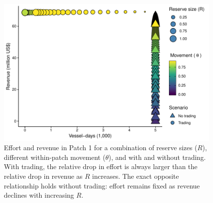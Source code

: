 \documentclass[12pt]{article}
\begin{document}
\begin{figure}
	\centering
	\includegraphics{img/effort_and_revenues.pdf}
	\caption{\label{fig:effort_and_revenues}Effort and revenue in Patch 1 for a combination of reserve sizes ($R$), different within-patch movement ($\theta$), and with and without trading. With trading, the relative drop in effort is always larger than the relative drop in revenue as $R$ increases. The exact opposite relationship holds without trading: effort remains fixed as revenue declines with increasing $R$.}
\end{figure}
\end{document}
